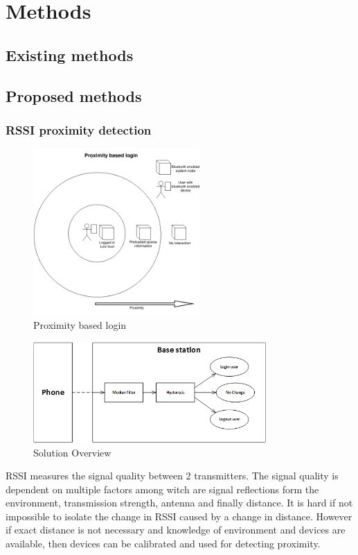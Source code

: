 \section{Methods}

\subsection{Existing methods}

\subsection{Proposed methods}

\subsubsection{RSSI proximity detection}

\begin{figure}[!t]
	\centering
	\includegraphics[width=2.5in]{img/proximityBasedLogin}
	\caption{ Proximity based login }
	\label{fig_proximity_based_login}
\end{figure}

\begin{figure}[!t]
	\centering
	\includegraphics[width=3.5in]{img/SolutionOverview}
	\caption{ Solution Overview }
	\label{fig_solution_overview}
\end{figure}

RSSI measures the signal quality between 2 transmitters. The signal quality is dependent on multiple factors among witch are signal reflections form the environment, transmission strength, antenna and finally distance. It is hard if not impossible to isolate the change in RSSI caused by a change in distance. However if exact distance is not necessary and knowledge of environment and devices are available, then devices can be calibrated and used for detecting proximity.

